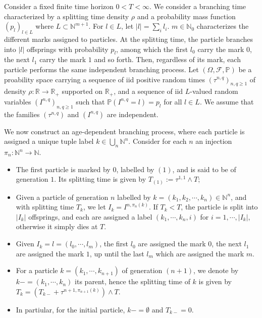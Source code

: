\documentclass[11pt]{article}
\newcommand{\R}{\mathbb{R}}
\newcommand{\N}{\mathbb{N}}
\renewcommand{\geq}{\geqslant}
\theoremstyle{definition}
\theoremstyle{remark}
\begin{document}
Consider a fixed finite time horizon $0 < T < \infty$.
We consider a branching time characterized by a splitting time density $\rho$ and a probability mass function $(p_l)_{l \in L}$ where $L \subset \N ^{m + 1}$. For $l \in L$, let $|l| = \sum_i l_i$. $m \in \N_0$ characterizes the different marks assigned to particles. At the splitting time, the particle branches into $|l|$ offsprings with probability $p_l$, among which the first $l_0$ carry the mark $0$, the next $l_1$ carry the mark $1$ and so forth. Then, regardless of its mark, each particle performs the same independent branching process.
Let $(\Omega, \mathcal F, \mathbb P)$ be a proability space carrying a sequence of iid positive random times $(\tau ^{n,q})_{n,q \geq 1}$ of density $\rho: \mathbb R \rightarrow \mathbb R _{+}$ supported on $\R _{+}$, and a sequence of iid $L$-valued random variables $(I ^{n,q})_{n,q \geq 1}$ such that $\mathbb P (I ^{n,q} = l) = p_l $ for all $l \in L$. We assume that the families $(\tau ^{n,q})$ and $(I ^{n,q})$ are independent.

We now construct an age-dependent branching process, where each particle is assigned a unique tuple label $ k \in \bigcup_n \mathbb N ^{n}$. Consider for each $n$ an injection $\pi_n : \N ^{n} \rightarrow \N$.
\begin{itemize}
    \item The first particle is marked by $0$, labelled by $(1)$, and is said to be of generation $1$. Its splitting time is given by $T _{(1)} := \tau ^{1,1} \wedge T$;
    \item Given a particle of generation $n$ labelled by $k = (k_1, k_2, \cdots, k_n) \in \N ^{n}$, and with splitting time $T _{k}$, we let $I_k = I ^{n, \pi_n (k)}$. If $T_k < T$, the particle is split into $|I_k|$ offsprings, and each are assigned a label $(k_1, \cdots, k_n, i)$ for $i = 1, \cdots, |I_k|$, otherwise it simply dies at $T$.
    \item Given $I_k = l = (l_0, \cdots, l_m)$, the first $l_0$ are assigned the mark $0$, the next $l_1$ are assigned the mark $1$, up until the last $l_m$ which are assigned the mark $m$.
    \item For a particle $k = (k_1, \cdots, k_{n+1})$ of generation $(n+1)$, we denote by $k- = (k_1, \cdots, k_n)$ its parent, hence the splitting time of $k$ is given by $T_k = (T _{k-} + \tau ^{n+1, \pi_{n+1}(k)})\wedge T$.
	    \item In partiular, for the initial particle, $k- = \emptyset$ and $T _{k-} = 0$.
\end{itemize}
\end{document}
